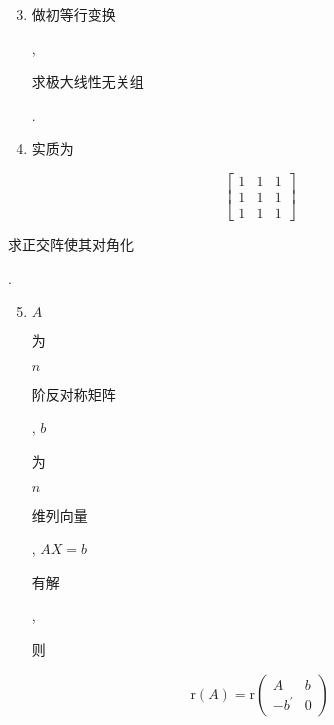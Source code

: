 \documentclass[10pt]{article}
\begin{document}
\begin{enumerate}
  \setcounter{enumi}{2}
  \item \begin{CJK}{UTF8}{mj}做初等行变换\end{CJK}, \begin{CJK}{UTF8}{mj}求极大线性无关组\end{CJK}.

  \item \begin{CJK}{UTF8}{mj}实质为\end{CJK}

\end{enumerate}
$$
\left[\begin{array}{lll}
1 & 1 & 1 \\
1 & 1 & 1 \\
1 & 1 & 1
\end{array}\right]
$$
\begin{CJK}{UTF8}{mj}求正交阵使其对角化\end{CJK}.

\begin{enumerate}
  \setcounter{enumi}{4}
  \item $A$ \begin{CJK}{UTF8}{mj}为\end{CJK} $n$ \begin{CJK}{UTF8}{mj}阶反对称矩阵\end{CJK}, $b$ \begin{CJK}{UTF8}{mj}为\end{CJK} $n$ \begin{CJK}{UTF8}{mj}维列向量\end{CJK}, $A X=b$ \begin{CJK}{UTF8}{mj}有解\end{CJK}, \begin{CJK}{UTF8}{mj}则\end{CJK}
\end{enumerate}
$$
\mathrm{r}(A)=\mathrm{r}\left(\begin{array}{cc}
A & b \\
-b^{\prime} & 0
\end{array}\right)
$$
\end{document}

